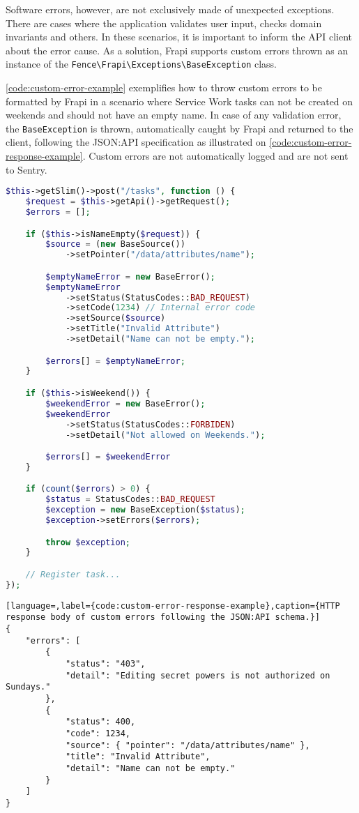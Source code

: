 Software errors, however, are not exclusively made of unexpected exceptions. There are cases where the application validates user input, checks domain invariants and others. In these scenarios, it is important to inform the API client about the error cause. As a solution, Frapi supports custom errors thrown as an instance of the \texttt{Fence\textbackslash Frapi\textbackslash Exceptions\textbackslash BaseException} class. 

\autoref{code:custom-error-example} exemplifies how to throw custom errors to be formatted by Frapi in a scenario where Service Work tasks can not be created on weekends and should not have an empty name. In case of any validation error, the \texttt{BaseException} is thrown, automatically caught by Frapi and returned to the client, following the JSON:API specification as illustrated on \autoref{code:custom-error-response-example}. Custom errors are not automatically logged and are not sent to Sentry.

\begin{lstlisting}[language=PHP,label={code:custom-error-example},caption={How to throw custom errors to be formated in user-friendly responses.}]
$this->getSlim()->post("/tasks", function () {
	$request = $this->getApi()->getRequest();
	$errors = [];

	if ($this->isNameEmpty($request)) {
        $source = (new BaseSource())
            ->setPointer("/data/attributes/name");

		$emptyNameError = new BaseError();
		$emptyNameError
			->setStatus(StatusCodes::BAD_REQUEST)
			->setCode(1234) // Internal error code
			->setSource($source)
			->setTitle("Invalid Attribute")
			->setDetail("Name can not be empty.");

		$errors[] = $emptyNameError;
	}

	if ($this->isWeekend()) {
		$weekendError = new BaseError();
		$weekendError
			->setStatus(StatusCodes::FORBIDEN)
		    ->setDetail("Not allowed on Weekends.");

		$errors[] = $weekendError
	}

	if (count($errors) > 0) {
        $status = StatusCodes::BAD_REQUEST
		$exception = new BaseException($status);
		$exception->setErrors($errors);

		throw $exception;
	}

	// Register task...
});
\end{lstlisting}

\begin{lstlisting}[language=,label={code:custom-error-response-example},caption={HTTP response body of custom errors following the JSON:API schema.}]
{
    "errors": [
        {
            "status": "403",
            "detail": "Editing secret powers is not authorized on Sundays."
        },
        {
            "status": 400,
            "code": 1234,
            "source": { "pointer": "/data/attributes/name" },
            "title": "Invalid Attribute",
            "detail": "Name can not be empty."
        }
    ]
}
\end{lstlisting}

